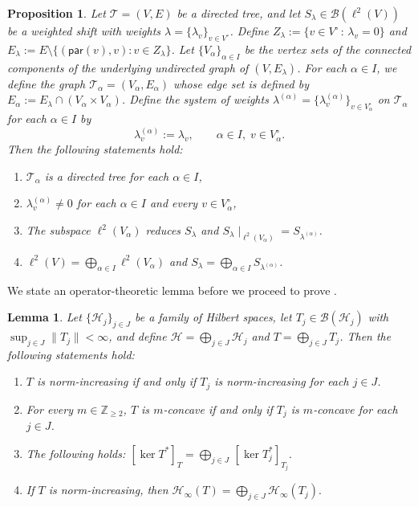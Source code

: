 \documentclass[11pt, reqno, a4paper]{amsart}
\newtheorem{lemma}[theorem]{Lemma}
\newtheorem{proposition}[theorem]{Proposition}
\theoremstyle{definition}
\newcommand{\calB}{{\mathcal{B}}}
\newcommand{\calH}{{\mathcal{H}}}
\newcommand{\scrT}{{\mathscr T}}
\renewcommand{\ge}{\geqslant}
\newcommand{\Z}{\mathbb Z}
\newcommand{\pr}{\mathsf{par}}
\numberwithin{equation}{section}
\begin{document}
\begin{proposition}
    \label{prop:tree-decomposition}
    Let $\scrT = ( V,  E)$ be a directed tree, and let $S_{\lambda} \in \calB (\ell ^2 (V))$ be a weighted shift with weights $\lambda = \{ \lambda_v \}_{v \in V^{\circ}}$. Define $Z_{\lambda} := \{ v \in  V^{\circ} \, : \, \lambda_{v} = 0 \}$ and $ E_{\lambda} :=  E \setminus \{ (\pr (v), v) : v \in Z_{\lambda} \}$. Let $\{  V_{\alpha} \}_{\alpha \in I}$ be the vertex sets of the connected components of the underlying undirected graph of $( V,  E_{\lambda})$. For each $\alpha \in I$, we define the graph $\scrT_{\alpha} = ( V_{\alpha},  E_{\alpha})$ whose edge set is defined by $ E_{\alpha} :=  E_{\lambda} \cap ( V_{\alpha} \times V_{\alpha})$. Define the system of weights $\lambda ^{(\alpha )} = \{ \lambda ^{(\alpha )}_{v} \}_{v \in  V_{\alpha} ^{\circ}}$ on $\scrT_{\alpha}$ for each $\alpha \in I$ by
    \begin{equation*}
        \lambda_{v}^{(\alpha)} := \lambda_{v}, \qquad \alpha \in I, \; v \in  V_{\alpha}^{\circ}.
    \end{equation*}
    Then the following statements hold:
    \begin{enumerate}
        \item[(i)] $\scrT_{\alpha}$ is a directed tree for each $\alpha \in I$,
        \item[(ii)]  $\lambda_{v}^{(\alpha)} \ne 0$ for each $\alpha \in I$ and every $v \in  V_{\alpha}^{\circ}$,
        \item[(iii)] The subspace $\ell ^2 ( V_{\alpha})$ reduces $S_{\lambda}$ and $S_{\lambda} \mid _{\ell ^2 ( V _{\alpha})} =  S_{\lambda ^{ (\alpha)}}$.
        \item [(iv)] $\ell ^2 ( V ) = \bigoplus _{\alpha \in I} \ell ^2 (V_{\alpha})$ and $S_{\lambda} = \bigoplus_{\alpha \in I} S_{\lambda^{(\alpha)}}$.
    \end{enumerate}
\end{proposition}

We state an operator-theoretic lemma before we proceed to prove .

\begin{lemma}
\label{lem:direct-sum}
Let $\{ \calH _j \}_{j\in J}$ be a family of Hilbert spaces, let $T_j\in\mathcal{B}(\calH _j)$ with $\sup_{j\in J}\|T_j\|<\infty$, and define $\calH=\bigoplus_{j\in J}\calH _j$ and $T=\bigoplus_{j\in J} T_j$. Then the following statements hold:
\begin{enumerate}
    \item[(i)] $T$ is norm-increasing if and only if $T_j$ is norm-increasing for each $j \in J$.
    \item[(ii)] For every $m\in\Z_{\ge 2}$, $T$ is $m$-concave if and only if $T_j$ is $m$-concave for each $j \in J$.
    \item[(iii)]  The following holds: $[\ker T^*]_T = \bigoplus_{j\in J} \, [\ker T_j^*]_{T_j}.$
    \item[(iv)] If $T$ is norm-increasing, then $\calH_{\infty} (T) = \bigoplus_{j\in J} \calH_{\infty} (T_j).$
\end{enumerate}

\end{lemma}
\end{document}
